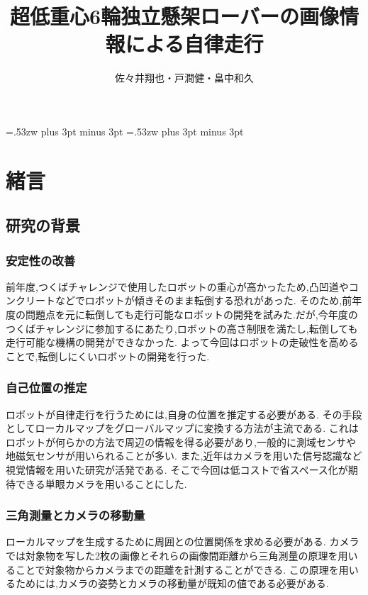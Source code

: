 \documentclass[12pt,oneside]{sotsuken_paper}
\title{超低重心6輪独立懸架ローバーの画像情報による自律走行}
\author{佐々井翔也・戸澗健・畠中和久}
\begin{document}
\setlength{\baselineskip}{9truemm}

\kanjiskip=.53zw plus 3pt minus 3pt
\xkanjiskip=.53zw plus 3pt minus 3pt

\tableofcontents


\chapter{緒言}
\section{研究の背景}

\subsection{安定性の改善}
前年度,つくばチャレンジで使用したロボットの重心が高かったため,凸凹道やコンクリートなどでロボットが傾きそのまま転倒する恐れがあった.
そのため,前年度の問題点を元に転倒しても走行可能なロボットの開発を試みた.だが,今年度のつくばチャレンジに参加するにあたり,ロボットの高さ制限を満たし,転倒しても走行可能な機構の開発ができなかった.
よって今回はロボットの走破性を高めることで,転倒しにくいロボットの開発を行った.
\subsection{自己位置の推定}
ロボットが自律走行を行うためには,自身の位置を推定する必要がある.
その手段としてローカルマップをグローバルマップに変換する方法が主流である.
これはロボットが何らかの方法で周辺の情報を得る必要があり,一般的に測域センサや地磁気センサが用いられることが多い.
また,近年はカメラを用いた信号認識など視覚情報を用いた研究が活発である.
そこで今回は低コストで省スペース化が期待できる単眼カメラを用いることにした.
\subsection{三角測量とカメラの移動量}
ローカルマップを生成するために周囲との位置関係を求める必要がある.
カメラでは対象物を写した2枚の画像とそれらの画像間距離から三角測量の原理を用いることで対象物からカメラまでの距離を計測することができる.
この原理を用いるためには,カメラの姿勢とカメラの移動量が既知の値である必要がある.
\end{document}
